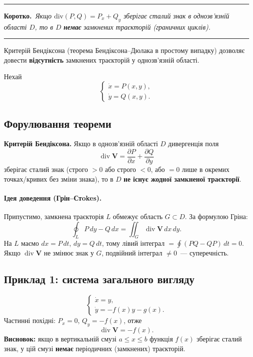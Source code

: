 \documentclass[12pt,a4paper]{article}
\newenvironment{korotko}
  {\par\medskip\noindent\begingroup\color{accent!75!black}\rule{\linewidth}{0.4pt}\par
   \noindent\textbf{Коротко.}\itshape\,}
  {\par\noindent\rule{\linewidth}{0.4pt}\endgroup\medskip}
\begin{document}
\begin{korotko}
Якщо $\mathrm{div}(P,Q)=P_x+Q_y$ зберігає сталий знак в однозв'язній області $D$,
то в $D$ \textbf{немає} замкнених траєкторій (граничних циклів).
\end{korotko}

Критерій Бендіксона (теорема Бендіксона--Дюлака в простому випадку) дозволяє
довести \textbf{відсутність} замкнених траєкторій у однозв'язній області.

Нехай
\begin{equation}\label{eq:bendixson-system}
\begin{cases}
  \dot{x} = P(x,y),\\
  \dot{y} = Q(x,y).
\end{cases}
\end{equation}

\subsection{Форулювання теореми}

\textbf{Критерій Бендіксона.} Якщо в однозв'язній області $D$ дивергенція поля
\begin{equation}\label{eq:divergence}
  \operatorname{div}\mathbf{V}
  = \frac{\partial P}{\partial x} + \frac{\partial Q}{\partial y}
\end{equation}
зберігає сталий знак (строго $>0$ або строго $<0$, або $=0$ лише в окремих
точках/кривих без зміни знака), то в $D$ \textbf{не існує жодної замкненої
траєкторії}.

\paragraph{Ідея доведення (Грін--Стokes).}
Припустимо, замкнена траєкторія $L$ обмежує область $G\subset D$. За формулою
Гріна:
\begin{equation*}
  \oint_L P\,dy - Q\,dx
  = \iint_G \operatorname{div}\mathbf{V}\,dx\,dy.
\end{equation*}
На $L$ маємо $dx=P\,dt$, $dy=Q\,dt$, тому лівий інтеграл $=\oint(PQ-QP)\,dt=0$.
Якщо $\operatorname{div}\mathbf{V}$ не змінює знак у $G$, подвійний інтеграл
$\neq 0$~--- суперечність.

\subsection{Приклад 1: система загального вигляду}

\begin{equation}\label{eq:bendixson-general}
\begin{cases}
  \dot{x} = y,\\
  \dot{y} = -f(x)y - g(x).
\end{cases}
\end{equation}
Частинні похідні: $P_x=0$, $Q_y=-f(x)$, отже
\begin{equation*}
  \operatorname{div}\mathbf{V} = -f(x).
\end{equation*}
\textbf{Висновок:} якщо в вертикальній смузі $a\le x\le b$ функція $f(x)$
зберігає сталий знак, у цій смузі \textbf{немає} періодичних (замкнених)
траєкторій.
\end{document}
